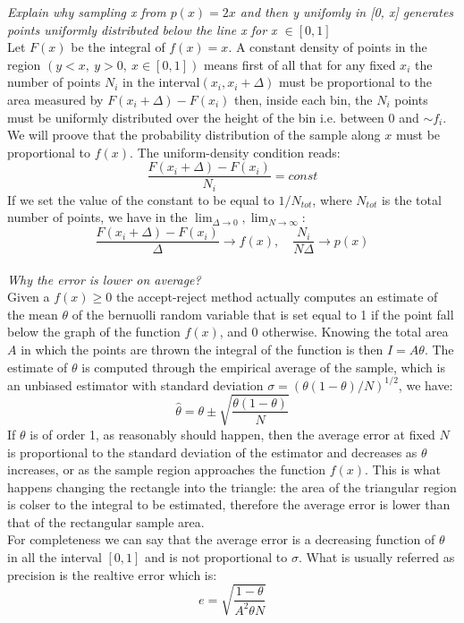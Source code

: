 \documentclass[10pt,a4paper]{report}
\begin{document}
\textit{Explain why sampling x from $p(x)=2x$ and then y unifomly in  [0, x] generates points uniformly distributed below the line x for x $\in [0,1]$} \\
Let $F(x)$ be the integral of $f(x)=x$. 
A constant density of points in the region $(y<x, \ y>0,\ x\in[0,1])$ means first of all that for any fixed $x_{i}$ the number of points $N_{i}$ in the interval$ (x_{i}, x_{i}+\Delta)$ must be proportional to the area measured by $F(x_{i}+\Delta)-F(x_{i})$ then, inside each bin, the $N_{i}$ points must be uniformly distributed over the height of the bin i.e. between 0 and $\sim f_{i}$. \\
We will proove that the probability distribution of the sample along $x$ must be proportional to $f(x)$.
The uniform-density condition reads:
\begin{equation}
\dfrac{F(x_{i}+\Delta)-F(x_{i})}{N_{i}}=const
\end{equation}
If we set the value of the constant to be equal to $1/N_{tot}$, where $N_{tot}$ is the total number of points, we have in the $\lim_{\Delta\to 0}, \lim_{N\to\infty} $:
\begin{equation}
\dfrac{F(x_{i}+\Delta)-F(x_{i})}{\Delta}\rightarrow f(x), \quad \dfrac{N_{i}}{N\Delta}\rightarrow p(x)
\end{equation} \\

\textit{Why the error is lower on average?}\\
Given a $f(x) \geq 0$ the accept-reject method actually computes an estimate of the mean $\theta$ of the bernuolli random variable that is set equal to 1 if the point fall below the graph of the function $f(x)$, and 0 otherwise. Knowing the total area $A$ in which the points are thrown the integral of the function is then $I=A\theta$. The estimate of $\theta$ is computed through the empirical average of the sample, which is an unbiased estimator with standard deviation $\sigma=(\theta(1-\theta)/N)^{1/2}$, we have:
\begin{equation}
\hat{\theta}=\theta \pm \sqrt{\dfrac{\theta(1-\theta)}{N}}
\end{equation}
If $\theta$ is of order 1, as reasonably should happen, then the average error at fixed $N$ is proportional to the standard deviation of the estimator and decreases as $\theta$ increases, or as the sample region approaches the function $f(x)$. This is what happens changing the rectangle into the triangle: the area of the triangular region is colser to the integral to be estimated, therefore the average error is lower than that of the rectangular sample area.\\
For completeness we can say that the average error is a decreasing function of $\theta$ in all the interval $[0,1]$ and is not proportional to $\sigma$.
What is usually referred as precision is the realtive error which is:
\begin{equation}
e=\sqrt{\dfrac{1-\theta}{A^{2}\theta N}}
\end{equation}
\end{document}
